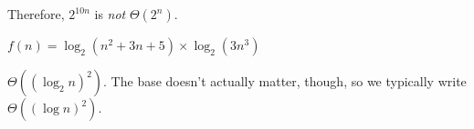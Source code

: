 \begin{prob}
\begin{subprobset}
\begin{subprob}
\begin{soln}
                Therefore, $2^{10n}$ is \emph{not} $\Theta(2^n)$.
            \end{soln}
        \end{subprob}


        \begin{subprob}
            $f(n) = \log_2(n^2 + 3n + 5) \times \log_2(3n^3)$

            \begin{soln}
                $\Theta((\log_2 n)^2)$. The base doesn't actually matter, though, so
                we typically write $\Theta((\log n)^2)$.
            \end{soln}
        \end{subprob}

    \end{subprobset}
\end{prob}
